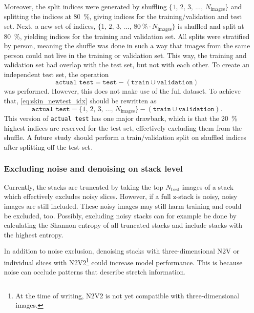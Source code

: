 Moreover, the split indices were generated by shuffling $\{1,\, 2,\, 3,\, \ldots,\, N_\mathrm{images}\}$ and splitting the indices at \qty{80}{\percent}, giving indices for the training/validation and test set.
Next, a new set of indices, $\{1,\, 2,\, 3,\, \ldots,\, \qty{80}{\percent} \cdot N_\mathrm{images}\}$ is shuffled and split at \qty{80}{\percent}, yielding indices for the training and validation set.
All splits were stratified by person, meaning the shuffle was done in such a way that images from the same person could not live in the training or validation set.
This way, the training and validation set had overlap with the test set, but not with each other.
To create an independent test set, the operation
\begin{equation}\label{eq:skin_newtest_idx}
    \texttt{actual test} = \texttt{test} - (\texttt{train} \cup \texttt{validation})
\end{equation}
was performed.
However, this does not make use of the full dataset.
To achieve that, \cref{eq:skin_newtest_idx} should be rewritten as
\begin{equation}
    \texttt{actual test} = \{1,\, 2,\, 3,\, \ldots,\, N_\mathrm{images}\} - (\texttt{train} \cup \texttt{validation}).
\end{equation}
This version of \texttt{actual test} has one major drawback, which is that the \qty{20}{\percent} highest indices are reserved for the test set, effectively excluding them from the shuffle.
A future study should perform a train/validation split on shuffled indices after splitting off the test set.

\subsubsection{Excluding noise and denoising on stack level}
Currently, the stacks are truncated by taking the top $N_\mathrm{best}$ images of a stack which effectively excludes noisy slices.
However, if a full z-stack is noisy, noisy images are still included.
These noisy images may still harm training and could be excluded, too.
Possibly, excluding noisy stacks can for example be done by calculating the Shannon entropy of all truncated stacks and include stacks with the highest entropy.

In addition to noise exclusion, denoising stacks with three-dimensional N2V or individual slices with N2V2\footnote{At the time of writing, N2V2 is not yet compatible with three-dimensional images.} could increase model performance.
This is because noise can occlude patterns that describe stretch information.

